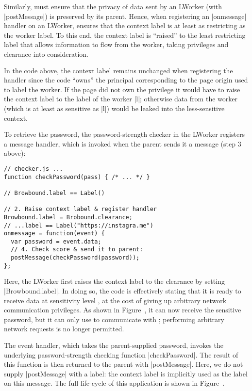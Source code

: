 Similarly, \sys{} must ensure that the privacy of data sent by an
LWorker (with \js|postMessage|) is preserved by its parent.
%
Hence, when registering an \js|onmessage| handler on an LWorker,
\sys{} ensures that the context label is at least as restricting as
the worker label.
%
To this end, the context label is ``raised'' to the least restricting
label that allows information to flow from the worker, taking
privileges and clearance into consideration.

In the  code above, the context label remains
unchanged when registering the handler since the code ``owns'' the
principal corresponding to the page origin used to label the worker.
%
If the page did not own the  privilege it would
have to raise the context label to the label of the worker \js|l|;
%
otherwise data from the worker (which is at least as sensitive as
\js|l|) would be leaked into the less-sensitive context.

To retrieve the password, the password-strength checker in the LWorker
registers a message handler, which is invoked when the parent
sends it a message (step 3 above):
\begin{lstlisting}
// checker.js ...
function checkPassword(pass) { /* ... */ }

// Browbound.label == Label()

// 2. Raise context label & register handler
Browbound.label = Brobound.clearance;
// ...label == Label("https://instagra.me")
onmessage = function(event) {
  var password = event.data;
  // 4. Check score & send it to parent:
  postMessage(checkPassword(password));
};
\end{lstlisting}
%
Here, the LWorker first raises the context label to the clearance by
setting \js|Browbound.label|.
%
In doing so, the code is effectively stating that it is ready to
receive data at sensitivity level , at the cost of
giving up arbitrary network communication privileges.
%
As shown in Figure~, it can now receive the
sensitive password, but it can only use \xhr{} to communicate with
;
%
performing arbitrary network requests is no longer permitted.

%
The event handler, which takes the parent-supplied password, invokes
the underlying password-strength checking function \js|checkPassword|.
%
The result of this function is then returned to the parent with
\js|postMessage|.
%
Here, we do not supply \js|postMessage| with a label: the context
label is implicitly used as the label on this message.
%
The full life-cycle of this application is shown in
Figure~.

